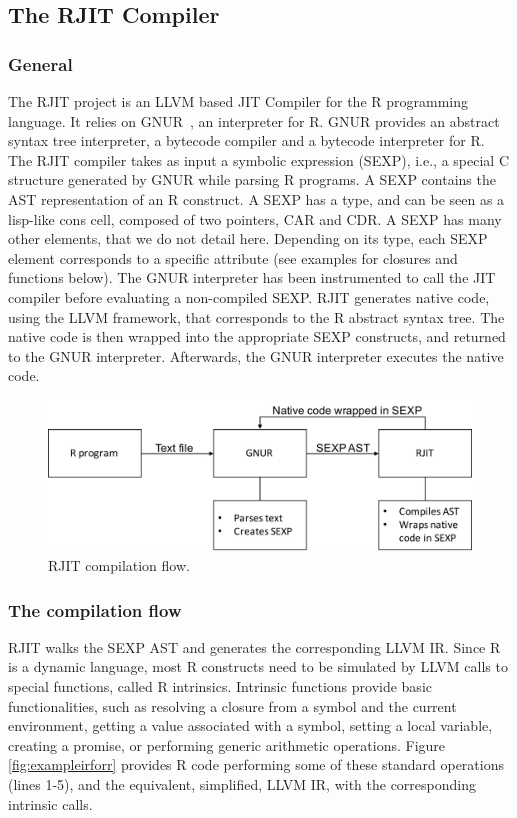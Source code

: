 \subsection{The RJIT Compiler}
\subsubsection{General}

The RJIT project is an LLVM based JIT Compiler for the R programming language.
It relies on GNUR~\cite{RURL}, an interpreter for R. 
GNUR provides an abstract syntax tree interpreter, a bytecode compiler and a bytecode interpreter for R.
The RJIT compiler takes as input a symbolic expression (SEXP), i.e., a special C structure generated by GNUR while parsing R programs.
A SEXP contains the AST representation of an R construct.
A SEXP has a type, and can be seen as a lisp-like cons cell, composed of two pointers, CAR and CDR.
A SEXP has many other elements, that we do not detail here.
Depending on its type, each SEXP element corresponds to a specific attribute (see examples for closures and functions below). 
The GNUR interpreter has been instrumented to call the JIT compiler before evaluating a non-compiled SEXP. 
RJIT generates native code, using the LLVM framework, that corresponds to the R abstract syntax tree.
The native code is then wrapped into the appropriate SEXP constructs, and returned to the GNUR interpreter.
Afterwards, the GNUR interpreter executes the native code.\\ 

\begin{figure}[h]
    \includegraphics[scale=0.5]{Figures/RJITFlow.pdf}
    \caption{RJIT compilation flow.}
\end{figure}

\subsubsection{The compilation flow}
RJIT walks the SEXP AST and generates the corresponding LLVM IR.
Since R is a dynamic language, most R constructs need to be simulated by LLVM calls to special functions, called R intrinsics.
Intrinsic functions provide basic functionalities, such as resolving a closure from a symbol and the current environment, getting a value associated with a symbol, setting a local variable, creating a promise, or performing generic arithmetic operations.
Figure \ref{fig:exampleirforr} provides R code performing some of these standard operations (lines 1-5), and the equivalent, simplified, LLVM IR, with the corresponding intrinsic calls.\\

